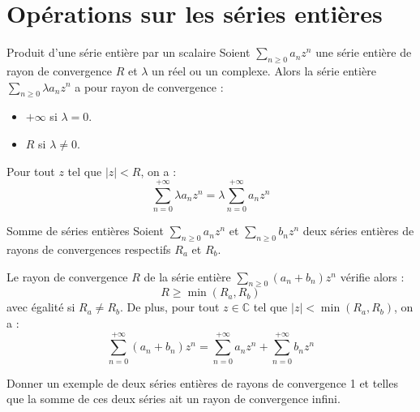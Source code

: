 \documentclass[french,11pt,twoside]{VcCours}
\begin{document}
\begin{Demonstration}{}
\vspace{4cm}
\end{Demonstration}

\section{Opérations sur les séries entières}

\begin{Theoreme}{Produit d'une série entière par un scalaire}
Soient $\sum_{n \geq 0} a_n z^n$ une série entière de rayon de convergence $R$ et $\lambda$ un réel ou un complexe. Alors la série entière $\sum_{n \geq 0} \lambda a_n z^n$ a pour rayon de convergence  :
\begin{itemize}
\item $+ \infty$ si $\lambda =0$.
\item $R$ si $\lambda \neq 0$.
\end{itemize}
Pour tout $z$ tel que $\vert z \vert < R$, on a :
$$ \sum_{n = 0}^{+ \infty} \lambda a_n z^n = \lambda \sum_{n = 0}^{+ \infty} a_n z^n $$
\end{Theoreme}




\begin{Theoreme}{Somme de séries entières}
Soient $\sum_{n \geq 0} a_n z^n$ et $\sum_{n \geq 0} b_n z^n$ deux séries entières de rayons de convergences respectifs $R_a$ et $R_b$.

Le rayon de convergence $R$ de la série entière $\sum_{n \geq 0} (a_n+b_n) z^n$ vérifie alors :
$$ R \geq \min(R_a,R_b)$$
avec égalité si $R_a \neq R_b$. De plus, pour tout $z \in \mathbb{C}$ tel que $\vert z \vert < \min(R_a, R_b)$, on a :
$$ \sum_{n = 0}^{+ \infty} (a_n +b_n) z^n =  \sum_{n = 0}^{+ \infty} a_n z^n +  \sum_{n = 0}^{+ \infty} b_n z^n$$
\end{Theoreme}

\begin{Demonstration}{}

\vspace{3.5cm}
\end{Demonstration}

\newpage

\phantom{test}

\vspace{3.5cm}

\begin{ApplicationDirecte}{} Donner un exemple de deux séries entières de rayons de convergence 1 et telles que la somme de ces deux séries ait un rayon de convergence infini.
\end{ApplicationDirecte}
\end{document}
